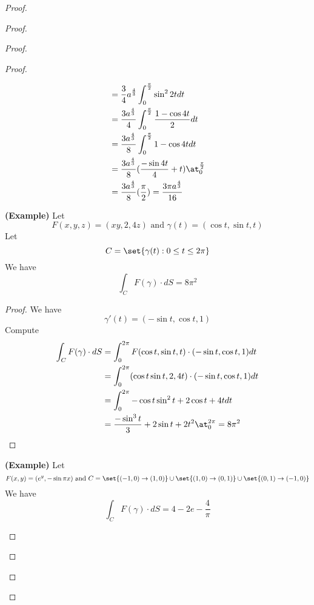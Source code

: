 \documentclass{report}
\begin{document}
\begin{proof}
\begin{proof}
\begin{proof}
\begin{proof}
\begin{theorem}
\begin{align}
  &=\frac{3}{4}a^{\frac{4}{3}}\int_0^{\frac{\pi}{2}} \sin^2 2t dt\\
  &=\frac{3a^{\frac{4}{3}}}{4}\int_0^{\frac{\pi}{2}} \frac{1-\cos 4t}{2}dt\\
  &=\frac{3a^{\frac{4}{3}}}{8}\int_0^{\frac{\pi}{2}} 1-\cos 4t dt\\
  &=\frac{3a^{\frac{4}{3}}}{8} (\frac{-\sin 4t}{4}+t)\at_{0}^{\frac{\pi}{2}}\\
  &=\frac{3a^{\frac{4}{3}}}{8}(\frac{\pi}{2})=\frac{3\pi a^{\frac{4}{3}}}{16}
\end{align}

\end{theorem}
\begin{theorem}
\label{9.1.8}
\textbf{(Example)} Let
\begin{equation}
F(x,y,z)=(xy,2,4z)\text{ and }\gamma (t)=(\cos t,\sin t,t)
\end{equation}
Let 
\begin{equation}
C=\set{\gamma (t):0\leq t\leq 2\pi }
\end{equation}
We have
\begin{equation}
\int_C F(\gamma )\cdot dS=8\pi^2
\end{equation}
\end{theorem}
\begin{proof}
We have
\begin{equation}
\gamma '(t)=(-\sin t,\cos t,1)
\end{equation}
Compute
\begin{align}
\int_C F(\gamma )\cdot dS&= \int_0^{2\pi} F(\cos t,\sin t,t)\cdot (-\sin t, \cos t,1)dt\\
&=\int_0^{2\pi} (\cos t\sin t, 2, 4t)\cdot (-\sin t,\cos t,1)dt\\
&=\int_0^{2\pi} -\cos t\sin^2 t+2\cos t+4tdt\\
&=\frac{-\sin^3 t}{3}+2\sin t+2t^2 \at_{0}^{2\pi}=8\pi^2
\end{align}
\end{proof}
\begin{theorem}
\label{9.1.9}
\textbf{(Example)} Let
\begin{equation}
F(x,y)=(e^{y},-\sin \pi x)\text{ and }C=\set{(-1,0)\to (1,0)}\cup \set{(1,0)\to (0,1)}\cup \set{(0,1)\to (-1,0)}
\end{equation}
We have
\begin{equation}
\int_C F(\gamma )\cdot dS=4-2e-\frac{4}{\pi}

\end{equation}
\end{theorem}
\end{proof}
\end{proof}
\end{proof}
\end{proof}
\end{document}
